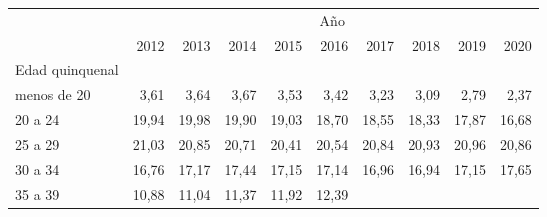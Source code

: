 \begin{tabular}{llllllllll}
\cline{1-10}
\multicolumn{1}{c}{} &
  \multicolumn{9}{|c}{Año} \\
\multicolumn{1}{c}{} &
  \multicolumn{1}{|r}{2012} &
  \multicolumn{1}{r}{2013} &
  \multicolumn{1}{r}{2014} &
  \multicolumn{1}{r}{2015} &
  \multicolumn{1}{r}{2016} &
  \multicolumn{1}{r}{2017} &
  \multicolumn{1}{r}{2018} &
  \multicolumn{1}{r}{2019} &
  \multicolumn{1}{r}{2020} \\
\cline{1-10}
\multicolumn{1}{l}{Edad quinquenal} &
  \multicolumn{1}{|r}{} &
  \multicolumn{1}{r}{} &
  \multicolumn{1}{r}{} &
  \multicolumn{1}{r}{} &
  \multicolumn{1}{r}{} &
  \multicolumn{1}{r}{} &
  \multicolumn{1}{r}{} &
  \multicolumn{1}{r}{} &
  \multicolumn{1}{r}{} \\
\multicolumn{1}{l}{\hspace{1em}menos de 20} &
  \multicolumn{1}{|r}{3,61} &
  \multicolumn{1}{r}{3,64} &
  \multicolumn{1}{r}{3,67} &
  \multicolumn{1}{r}{3,53} &
  \multicolumn{1}{r}{3,42} &
  \multicolumn{1}{r}{3,23} &
  \multicolumn{1}{r}{3,09} &
  \multicolumn{1}{r}{2,79} &
  \multicolumn{1}{r}{2,37} \\
\multicolumn{1}{l}{\hspace{1em}20 a 24} &
  \multicolumn{1}{|r}{19,94} &
  \multicolumn{1}{r}{19,98} &
  \multicolumn{1}{r}{19,90} &
  \multicolumn{1}{r}{19,03} &
  \multicolumn{1}{r}{18,70} &
  \multicolumn{1}{r}{18,55} &
  \multicolumn{1}{r}{18,33} &
  \multicolumn{1}{r}{17,87} &
  \multicolumn{1}{r}{16,68} \\
\multicolumn{1}{l}{\hspace{1em}25 a 29} &
  \multicolumn{1}{|r}{21,03} &
  \multicolumn{1}{r}{20,85} &
  \multicolumn{1}{r}{20,71} &
  \multicolumn{1}{r}{20,41} &
  \multicolumn{1}{r}{20,54} &
  \multicolumn{1}{r}{20,84} &
  \multicolumn{1}{r}{20,93} &
  \multicolumn{1}{r}{20,96} &
  \multicolumn{1}{r}{20,86} \\
\multicolumn{1}{l}{\hspace{1em}30 a 34} &
  \multicolumn{1}{|r}{16,76} &
  \multicolumn{1}{r}{17,17} &
  \multicolumn{1}{r}{17,44} &
  \multicolumn{1}{r}{17,15} &
  \multicolumn{1}{r}{17,14} &
  \multicolumn{1}{r}{16,96} &
  \multicolumn{1}{r}{16,94} &
  \multicolumn{1}{r}{17,15} &
  \multicolumn{1}{r}{17,65} \\
\multicolumn{1}{l}{\hspace{1em}35 a 39} &
  \multicolumn{1}{|r}{10,88} &
  \multicolumn{1}{r}{11,04} &
  \multicolumn{1}{r}{11,37} &
  \multicolumn{1}{r}{11,92} &
  \multicolumn{1}{r}{12,39} &

\end{tabular}
